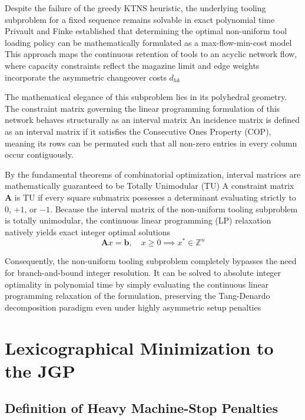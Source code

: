\documentclass[11pt, a4paper]{book}
\begin{document}
	Despite the failure of the greedy KTNS heuristic, the underlying tooling subproblem for a fixed sequence remains solvable in exact polynomial time %
	Privault and Finke established that determining the optimal non-uniform tool loading policy can be mathematically formulated as a max-flow-min-cost model %
	This approach maps the continuous retention of tools to an acyclic network flow, where capacity constraints reflect the magazine limit and edge weights incorporate the asymmetric changeover costs $d_{hk}$ %
	
	The mathematical elegance of this subproblem lies in its polyhedral geometry.
	The constraint matrix governing the linear programming formulation of this network behaves structurally as an interval matrix %
	An incidence matrix is defined as an interval matrix if it satisfies the Consecutive Ones Property (COP), meaning its rows can be permuted such that all non-zero entries in every column occur contiguously.
	
	By the fundamental theorems of combinatorial optimization, interval matrices are mathematically guaranteed to be Totally Unimodular (TU) %
	A constraint matrix $\mathbf{A}$ is TU if every square submatrix possesses a determinant evaluating strictly to $0$, $+1$, or $-1$.
	Because the interval matrix of the non-uniform tooling subproblem is totally unimodular, the continuous linear programming (LP) relaxation natively yields exact integer optimal solutions %
	\begin{equation}
		\mathbf{A}x = \mathbf{b}, \quad x \ge 0 \implies x^* \in \mathbb{Z}^n
	\end{equation}
	
	Consequently, the non-uniform tooling subproblem completely bypasses the need for branch-and-bound integer resolution.
	It can be solved to absolute integer optimality in polynomial time by simply evaluating the continuous linear programming relaxation of the formulation, preserving the Tang-Denardo decomposition paradigm even under highly asymmetric setup penalties %
	
	\section{Lexicographical Minimization to the JGP}
	
	\subsection{Definition of Heavy Machine-Stop Penalties}
	
\end{document}
